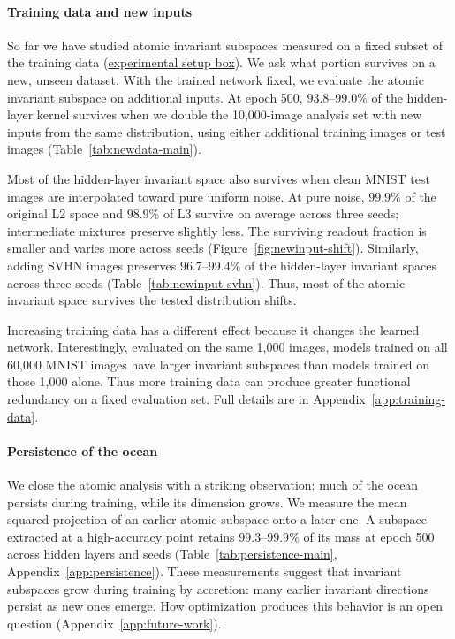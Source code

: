 \documentclass[twoside]{article}
\theoremstyle{remark}
\theoremstyle{highlightdefinition}
\theoremstyle{remark}
\begin{document}
\paragraph{Training data and new inputs}
\label{sec:otherdata}
So far we have studied atomic invariant subspaces measured on a fixed subset of the training data (\hyperlink{experimental-setup}{experimental setup box}). We ask what portion survives on a new, unseen dataset. With the trained network fixed, we evaluate the atomic invariant subspace on additional inputs. At epoch 500, $93.8$--$99.0\%$ of the hidden-layer kernel survives when we double the 10,000-image analysis set with new inputs from the same distribution, using either additional training images or test images (Table~\ref{tab:newdata-main}). 

Most of the hidden-layer invariant space also survives when clean MNIST test images are interpolated toward pure uniform noise. At pure noise, $99.9\%$ of the original L2 space and $98.9\%$ of L3 survive on average across three seeds; intermediate mixtures preserve slightly less. The surviving readout fraction is smaller and varies more across seeds (Figure~\ref{fig:newinput-shift}). Similarly, adding SVHN images preserves $96.7$--$99.4\%$ of the hidden-layer invariant spaces across three seeds (Table~\ref{tab:newinput-svhn}). Thus, most of the atomic invariant space survives the tested distribution shifts. 

Increasing training data has a different effect because it changes the learned network. Interestingly, evaluated on the same 1,000 images, models trained on all 60,000 MNIST images have larger invariant subspaces than models trained on those 1,000 alone. Thus more training data can produce greater functional redundancy on a fixed evaluation set. 
Full details are in Appendix~\ref{app:training-data}.

\paragraph{Persistence of the ocean}
\label{sec:persistence}
We close the atomic analysis with a striking observation: much of the ocean persists during training, while its dimension grows. We measure the mean squared projection of an earlier atomic subspace onto a later one. A subspace extracted at a high-accuracy point retains $99.3$--$99.9\%$ of its mass at epoch 500 across hidden layers and seeds  (Table~\ref{tab:persistence-main}, Appendix~\ref{app:persistence}). These measurements suggest that invariant subspaces grow during training by accretion: many earlier invariant directions persist as new ones emerge. How optimization produces this behavior is an open question (Appendix~\ref{app:future-work}).

\end{document}

